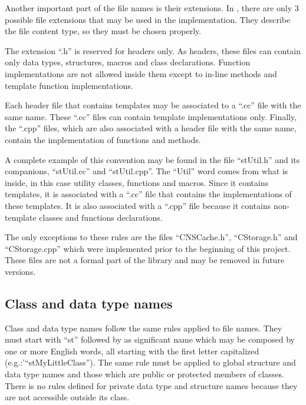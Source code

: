 Another important part of the file names is their extensions. In \libname, there are only 3 possible file extensions that may be used in the implementation. They describe the file content type, so they must be chosen properly.

The extension ``.h'' is reserved for headers only. As headers, these files can contain only data types, structures, macros and class declarations. Function implementations are not allowed inside them except to in-line methods and template function implementations.

Each header file that contains templates may be associated to a ``.cc'' file with the same name. These ``.cc'' files can contain template implementations only. Finally, the ``.cpp'' files, which are also associated with a header file with the same name, contain the implementation of functions and methods.

A complete example of this convention may be found in the file ``stUtil.h'' and its companions, ``stUtil.cc'' and ``stUtil.cpp''. The ``Util'' word comes from what is inside, in this case utility classes,  functions and macros. Since it contains templates, it is associated with a ``.cc'' file that contains the implementations of these templates. It is also associated with a ``.cpp'' file because it contains non-template classes and functions declarations.

The only exceptions to these rules are the files ``CNSCache.h'', ``CStorage.h'' and ``CStorage.cpp'' which were implemented prior to the beginning of this project. These files are not a formal part of the library and may be removed in future versions.

\subsection{Class and data type names}
\label{sec:coding.classnames}

Class and data type names follow the same rules applied to file names. They must start with ``st'' followed by as significant name which may be composed by one or more English words, all starting with the first letter capitalized (e.g.:'``stMyLittleClass''). The same rule must be applied to global structure and data type names and those which are public or protected members of classes. There is no rules defined for private data type and structure names because they are not accessible outside its class.


